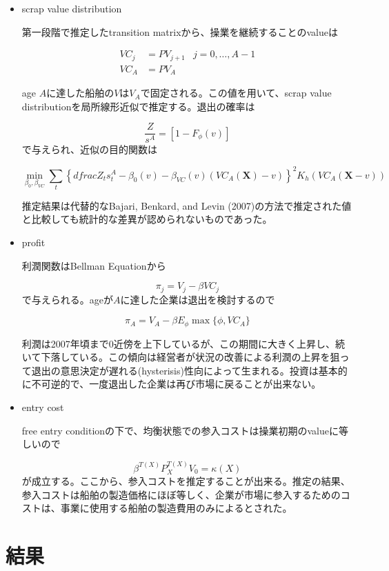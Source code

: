 \documentclass[11pt]{jsarticle}
\begin{document}
\begin{itemize}
  \item scrap value distribution

  第一段階で推定したtransition matrixから、操業を継続することのvalueは

  \begin{align*}
    VC_j &= PV_{j+1} & j = 0, \ldots, A-1 \\
    VC_A &= PV_A
  \end{align*}

  age $A$に達した船舶の$V$は$V_A$で固定される。この値を用いて、scrap value distributionを局所線形近似で推定する。退出の確率は

  \[
  \dfrac{Z}{s^A} = [1-F_{\phi}(v)]
  \]
  で与えられ、近似の目的関数は

  \[
  \min_{\beta_0, \beta_{VC}} \sum_t \left\{ dfrac{Z_t}{s_t^A} - \beta_0(v) - \beta_{VC}(v)(VC_A(\mathbf{X}) - v) \right\}^2 K_h(VC_A (\mathbf{X} - v))
  \]

  推定結果は代替的なBajari, Benkard, and Levin (2007)の方法で推定された値と比較しても統計的な差異が認められないものであった。

  \item profit

  利潤関数はBellman Equationから

  \[
  \pi_j = V_j - \beta VC_j
  \]
  で与えられる。ageが$A$に達した企業は退出を検討するので

  \[
  \pi_A = V_A - \beta E_{\phi} \max \{\phi, VC_A \}
  \]

  利潤は2007年頃まで0近傍を上下しているが、この期間に大きく上昇し、続いて下落している。この傾向は経営者が状況の改善による利潤の上昇を狙って退出の意思決定が遅れる(hysterisis)性向によって生まれる。投資は基本的に不可逆的で、一度退出した企業は再び市場に戻ることが出来ない。

  \item entry cost

  free entry conditionの下で、均衡状態での参入コストは操業初期のvalueに等しいので

  \[
  \beta^{T(X)}P_X^{T(X)}V_0 = \kappa(X)
  \]
  が成立する。ここから、参入コストを推定することが出来る。推定の結果、参入コストは船舶の製造価格にほぼ等しく、企業が市場に参入するためのコストは、事業に使用する船舶の製造費用のみによるとされた。
\end{itemize}

\section{結果}
\end{document}
